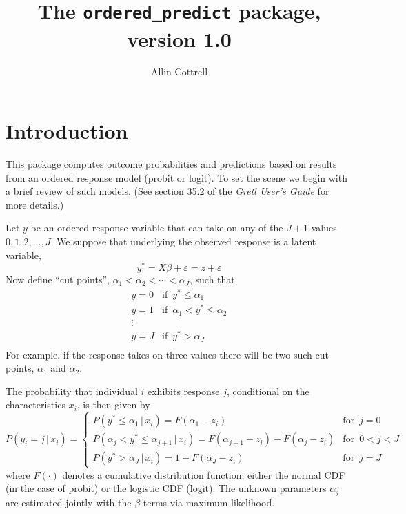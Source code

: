 \documentclass{article}
\begin{document}
\setlength{\parindent}{0pt}
\setlength{\parskip}{1ex}
\setcounter{secnumdepth}{2}

\newcommand{\argname}[1]{\textsl{#1}}
  
\title{The \texttt{ordered\_predict} package, version 1.0}
\author{Allin Cottrell}
\maketitle

\section{Introduction}
\label{sec:intro}

This package computes outcome probabilities and predictions based on
results from an ordered response model (probit or logit). To set the
scene we begin with a brief review of such models. (See section 35.2
of the \textit{Gretl User's Guide} for more details.)

Let $y$ be an ordered response variable that can take on any of the
$J+1$ values ${0,1,2,\dots,J}$.  We suppose that underlying the
observed response is a latent variable,
\begin{equation}
  \label{eq:latent}
  y^* = X\beta + \varepsilon = z + \varepsilon
\end{equation}
Now define ``cut points'', $\alpha_1 < \alpha_2 < \cdots < \alpha_J$,
such that
%
\begin{equation}
  \label{eq:cuts}
  \begin{array}{ll}
    y = 0 & \textrm{if } \, y^* \leq \alpha_1 \\
    y = 1 & \textrm{if } \, \alpha_1 < y^* \leq \alpha_2 \\
    \vdots \\
    y = J & \textrm{if } \, y^* > \alpha_J \\
  \end{array}
\end{equation}
For example, if the response takes on three values there will be two
such cut points, $\alpha_1$ and $\alpha_2$. 

The probability that individual $i$ exhibits response $j$, conditional
on the characteristics $x_i$, is then given by
%
\begin{equation}
  \label{eq:ordered-probs}
  P(y_i = j \,|\, x_i) = \left\{
    \begin{array}{ll}
      P(y^* \leq \alpha_1 \,|\, x_i) = F(\alpha_1 - z_i) & \textrm{for }\, j = 0 \\
      P(\alpha_j < y^* \leq \alpha_{j+1} \,|\, x_i) = 
      F(\alpha_{j+1} - z_i) -  F(\alpha_j - z_i) & \textrm{for }\, 0 < j < J \\
      P(y^* > \alpha_J \,|\, x_i) = 1 -  F(\alpha_J - z_i) & \textrm{for }\, j = J 
    \end{array}
    \right.
\end{equation}
%
where $F(\cdot)$ denotes a cumulative distribution function: either
the normal CDF (in the case of probit) or the logistic CDF
(logit). The unknown parameters $\alpha_j$ are estimated jointly with
the $\beta$ terms via maximum likelihood.
\end{document}
